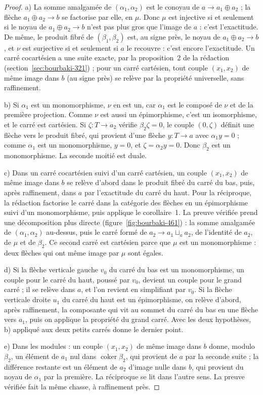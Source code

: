 \begin{proof}
a) La somme amalgamée de $(\alpha_1, \alpha_2)$ est le conoyau de $a \to a_1 \oplus a_2$ ; la flèche $a_1 \oplus a_2 \to b$ se factorise par elle, en $\mu$. Donc $\mu$ est injective si et seulement si le noyau de $a_1 \oplus a_2 \to b$ n'est pas plus gros que l'image de $a$ : c'est l'exactitude. De même, le produit fibré de $(\beta_1, \beta_2)$ est, au signe près, le noyau de $a_1 \oplus a_2 \to b$, et $\nu$ est surjective si et seulement si $a$ le recouvre : c'est encore l'exactitude. Un carré cocartésien a une suite exacte, par la proposition~2 de la rédaction  (section~\ref{sec:bourbaki-321}) ; pour un carré cartésien, tout couple $(x_1, x_2)$ de même image dans $b$ (au signe près) se relève par la propriété universelle, sans raffinement.

b) Si $\alpha_1$ est un monomorphisme, $\nu$ en est un, car $\alpha_1$ est le composé de $\nu$ et de la première projection. Comme $\nu$ est aussi un épimorphisme, c'est un isomorphisme, et le carré est cartésien. Si $\zeta : T \to a_2$ vérifie $\beta_2 \zeta = 0$, le couple $(0, \zeta)$ définit une flèche vers le produit fibré, qui provient d'une flèche $y : T \to a$ avec $\alpha_1 y = 0$ ; comme $\alpha_1$ est un monomorphisme, $y = 0$, et $\zeta = \alpha_2 y = 0$. Donc $\beta_2$ est un monomorphisme. La seconde moitié est duale.

c) Dans un carré cocartésien suivi d'un carré cartésien, un couple $(x_1, x_2)$ de même image dans $b$ se relève d'abord dans le produit fibré du carré du bas, puis, après raffinement, dans $a$ par l'exactitude du carré du haut. Pour la réciproque, la rédaction factorise le carré dans la catégorie des flèches en un épimorphisme suivi d'un monomorphisme, puis applique le corollaire~1. La preuve vérifiée prend une décomposition plus directe (figure~\ref{fig:bourbaki-461}) : la somme amalgamée de $(\alpha_1, \alpha_2)$ au-dessus, puis le carré formé de $a_2 \to a_1 \sqcup_a a_2$, de l'identité de $a_2$, de $\mu$ et de $\beta_2$. Ce second carré est cartésien parce que $\mu$ est un monomorphisme : deux flèches qui ont même image par $\mu$ sont égales.

d) Si la flèche verticale gauche $v_0$ du carré du bas est un monomorphisme, un couple pour le carré du haut, poussé par $v_0$, devient un couple pour le grand carré ; il se relève dans $a$, et l'on revient en simplifiant par $v_0$. Si la flèche verticale droite $u_1$ du carré du haut est un épimorphisme, on relève d'abord, après raffinement, la composante qui vit au sommet du carré du bas en une flèche vers $a_1$, puis on applique la propriété du grand carré. Avec les deux hypothèses, b) appliqué aux deux petits carrés donne le dernier point.

e) Dans les modules : un couple $(x_1, x_2)$ de même image dans $b$ donne, modulo $\beta_2$, un élément de $a_1$ nul dans $\operatorname{coker} \beta_2$, qui provient de $a$ par la seconde suite ; la différence restante est un élément de $a_2$ d'image nulle dans $b$, qui provient du noyau de $\alpha_1$ par la première. La réciproque se lit dans l'autre sens. La preuve vérifiée fait la même chasse, à raffinement près.
\end{proof}

